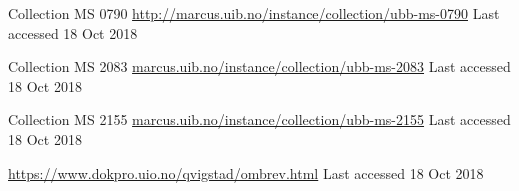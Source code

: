 \documentclass[runningheads]{llncs}
\begin{document}
\begin{thebibliography}{8}
Collection MS 0790 \url{http://marcus.uib.no/instance/collection/ubb-ms-0790}
Last accessed 18 Oct 2018

Collection MS 2083 \url{marcus.uib.no/instance/collection/ubb-ms-2083}
Last accessed 18 Oct 2018

Collection MS 2155 \url{marcus.uib.no/instance/collection/ubb-ms-2155}
Last accessed 18 Oct 2018

\url{https://www.dokpro.uio.no/qvigstad/ombrev.html}
Last accessed 18 Oct 2018

\end{thebibliography}
\end{document}
